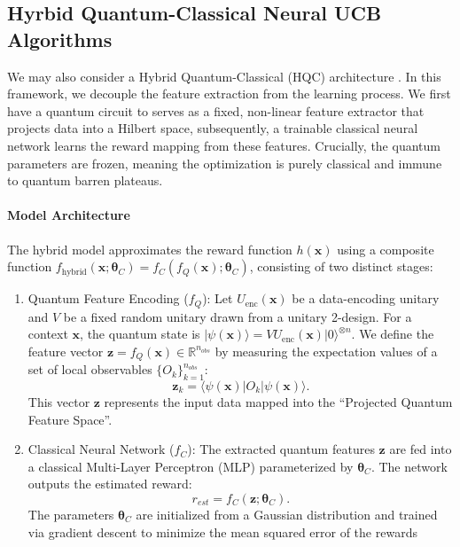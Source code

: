 \documentclass[pdflatex,sn-mathphys-num]{sn-jnl}%
\theoremstyle{thmstyleone}%
\theoremstyle{thmstyletwo}%
\theoremstyle{thmstylethree}%
\newcommand{\xbf}{\mathbf{x}}
\newcommand{\zbf}{\mathbf{z}}
\begin{document}
\begin{appendices}
\iffalse
\section{Hyrbid Quantum-Classical Neural UCB Algorithms} \label{appB}

We may also consider a Hybrid Quantum-Classical (HQC) architecture \cite{hybridqcntk}. 
In this framework, we decouple the feature extraction from the learning process. We first have a quantum circuit to serves as a fixed, non-linear feature extractor that projects data into a Hilbert space, subsequently, a trainable classical neural network learns the reward mapping from these features. 
Crucially, the quantum parameters are frozen, meaning the optimization is purely classical and immune to quantum barren plateaus.

\paragraph{Model Architecture} The hybrid model approximates the reward function $h(\xbf)$ using a composite function $f_{\text{hybrid}}(\xbf; \bm{\theta}_C) = f_C(f_Q(\xbf); \bm{\theta}_C)$, consisting of two distinct stages:
\begin{enumerate}
    \item Quantum Feature Encoding ($f_Q$): Let $U_{\text{enc}}(\xbf)$ be a data-encoding unitary and $V$ be a fixed random unitary drawn from a unitary 2-design. For a context $\xbf$, the quantum state is $|\psi(\xbf)\rangle = V U_{\text{enc}}(\xbf) |0\rangle^{\otimes n}$. We define the feature vector $\zbf = f_Q(\xbf) \in \mathbb{R}^{n_{obs}}$ by measuring the expectation values of a set of local observables $\{O_k\}_{k=1}^{n_{obs}}$:$$\zbf_k = \langle \psi(\xbf) | O_k | \psi(\xbf) \rangle.$$ This vector $\zbf$ represents the input data mapped into the ``Projected Quantum Feature Space''.
    \item Classical Neural Network ($f_C$): The extracted quantum features $\zbf$ are fed into a classical Multi-Layer Perceptron (MLP) parameterized by $\bm{\theta}_C$. The network outputs the estimated reward:$$r_{est} = f_C(\zbf; \bm{\theta}_C).$$The parameters $\bm{\theta}_C$ are initialized from a Gaussian distribution and trained via gradient descent to minimize the mean squared error of the rewards
\end{enumerate}

\end{appendices}
\end{document}
